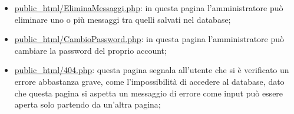 {\begin{itemize}
		\item \href{http://tecnologie-web.studenti.math.unipd.it/tecweb/~pgabelli/public\_html/EliminaMessaggi.php}{public\_html/EliminaMessaggi.php}: in questa pagina l'amministratore può eliminare uno o più messaggi tra quelli salvati nel database;
		\item \href{http://tecnologie-web.studenti.math.unipd.it/tecweb/~pgabelli/public\_html/CambioPassword.php}{public\_html/CambioPassword.php}: in questa pagina l'amministratore può cambiare la password del proprio account;
		\item \href{http://tecnologie-web.studenti.math.unipd.it/tecweb/~pgabelli/public\_html/404.php}{public\_html/404.php}: questa pagina segnala all'utente che si è verificato un errore abbastanza grave, come l'impossibilità di accedere al database, dato che questa pagina si aspetta un messaggio di errore come input può essere aperta solo partendo da un'altra pagina;
	\end{itemize}
}